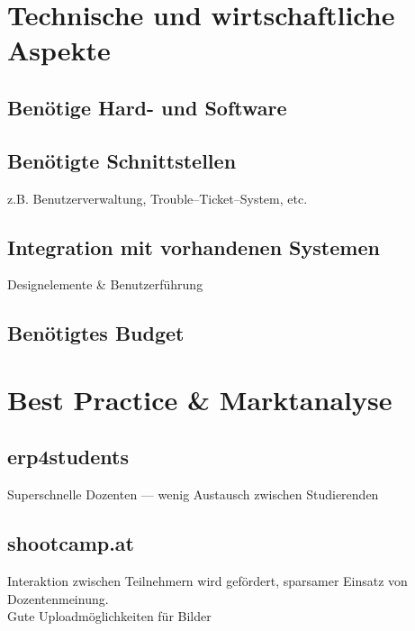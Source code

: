\section{Technische und wirtschaftliche Aspekte} %
\label{sec:technische_und_wirtschaftliche_aspekte}

\subsection{Benötige Hard- und Software} %
\label{sub:benotige_hard_und_software}


\subsection{Benötigte Schnittstellen} %
\label{sub:benotigte_schnittstellen}
z.B. Benutzerverwaltung, Trouble–Ticket–System, etc.

\subsection{Integration mit vorhandenen Systemen} %
\label{sub:integration_mit_vorhandenen_systemen}
Designelemente \& Benutzerführung

\subsection{Benötigtes Budget} %
\label{sub:benotigtes_budget}



\section{Best Practice \& Marktanalyse} %
\label{sec:best_practice}

\subsection{erp4students} %
\label{sub:erp4students}
Superschnelle Dozenten --- wenig Austausch zwischen Studierenden

\subsection{shootcamp.at} %
\label{sub:shootcamp_at}
Interaktion zwischen Teilnehmern wird gefördert, sparsamer Einsatz von Dozentenmeinung.\\
Gute Uploadmöglichkeiten für Bilder

